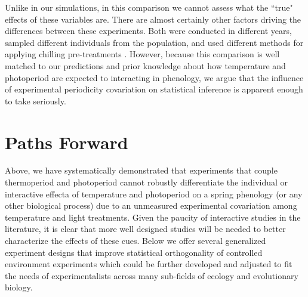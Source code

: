 \documentclass[11pt]{article}
\begin{document}
Unlike in our simulations, in this comparison we cannot assess what the ``true" effects of these variables are. There are almost certainly other factors driving the differences between these experiments. Both were conducted in different years, sampled different individuals from the population, and used different methods for applying chilling pre-treatments \citep{Flynn2018,Buonaiuto:2021ug}. However, because this comparison is well matched to our predictions and prior knowledge about how temperature and photoperiod are expected to interacting in phenology, we argue that the influence of experimental periodicity covariation on statistical inference is apparent enough to take seriously.\\

\section*{Paths Forward}
Above, we have systematically demonstrated that experiments that couple thermoperiod and photoperiod cannot robustly differentiate the individual or interactive effecta of temperature and photoperiod on a spring phenology (or any other biological process) due to an unmeasured experimental covariation among temperature and light treatments. Given the paucity of interactive studies in the literature, it is clear that more well designed studies will be needed to better characterize the effects of these cues. Below we offer several generalized experiment designs that improve statistical orthogonality of controlled environment experiments which could be further developed and adjusted to fit the needs of experimentalists across many sub-fields of ecology and evolutionary biology.
\end{document}
